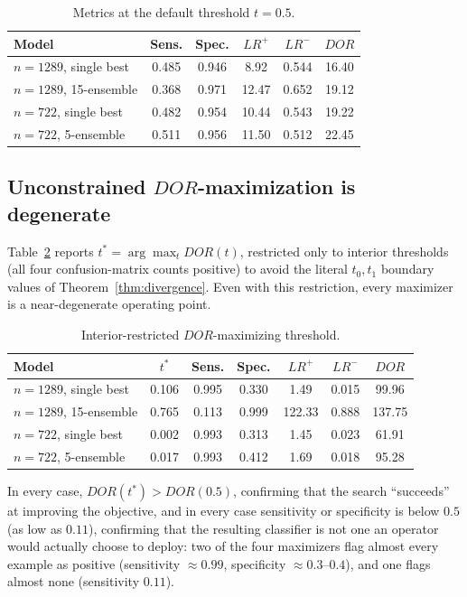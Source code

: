 \documentclass[11pt]{article}
\begin{document}
\begin{table}[ht]
\centering
\caption{Metrics at the default threshold $t=0.5$.}
\label{tab:default}
\begin{tabular}{lccccc}
\toprule
Model & Sens. & Spec. & $LR^+$ & $LR^-$ & $DOR$ \\
\midrule
$n{=}1289$, single best   & 0.485 & 0.946 & 8.92  & 0.544 & 16.40 \\
$n{=}1289$, 15-ensemble   & 0.368 & 0.971 & 12.47 & 0.652 & 19.12 \\
$n{=}722$, single best    & 0.482 & 0.954 & 10.44 & 0.543 & 19.22 \\
$n{=}722$, 5-ensemble     & 0.511 & 0.956 & 11.50 & 0.512 & 22.45 \\
\bottomrule
\end{tabular}
\end{table}

\subsection{Unconstrained $DOR$-maximization is degenerate}

Table~\ref{tab:maxdor} reports $t^\ast = \arg\max_t DOR(t)$, restricted only
to interior thresholds (all four confusion-matrix counts positive) to avoid
the literal $t_0, t_1$ boundary values of Theorem~\ref{thm:divergence}.
Even with this restriction, every maximizer is a near-degenerate operating
point.

\begin{table}[ht]
\centering
\caption{Interior-restricted $DOR$-maximizing threshold.}
\label{tab:maxdor}
\begin{tabular}{lcccccc}
\toprule
Model & $t^\ast$ & Sens. & Spec. & $LR^+$ & $LR^-$ & $DOR$ \\
\midrule
$n{=}1289$, single best   & 0.106 & 0.995 & 0.330 & 1.49   & 0.015 & 99.96 \\
$n{=}1289$, 15-ensemble   & 0.765 & 0.113 & 0.999 & 122.33 & 0.888 & 137.75 \\
$n{=}722$, single best    & 0.002 & 0.993 & 0.313 & 1.45   & 0.023 & 61.91 \\
$n{=}722$, 5-ensemble     & 0.017 & 0.993 & 0.412 & 1.69   & 0.018 & 95.28 \\
\bottomrule
\end{tabular}
\end{table}

In every case, $DOR(t^\ast) > DOR(0.5)$, confirming that the search
``succeeds'' at improving the objective, and in every case sensitivity or
specificity is below $0.5$ (as low as $0.11$), confirming that the
resulting classifier is not one an operator would actually choose to
deploy: two of the four maximizers flag almost every example as positive
(sensitivity $\approx 0.99$, specificity $\approx 0.3$--$0.4$), and one
flags almost none (sensitivity $0.11$).
\end{document}
